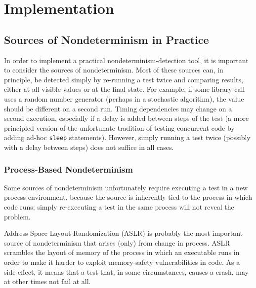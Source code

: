 \section{Implementation}

\subsection{Sources of Nondeterminism in Practice}

In order to implement a practical nondeterminism-detection tool, it is
important to consider the sources of nondeterminism.  Most of these
sources can, in principle, be detected simply by re-running a test
twice and comparing results, either at all visible values or at the
final state.  For example, if some library call uses a random number
generator (perhaps in a stochastic algorithm), the value should be
different on a second run.  Timing dependencies may change on a second
execution, especially if a delay is added between steps of the test (a
more principled version of the unfortunate tradition of testing
concurrent code by adding ad-hoc {\tt sleep} statements).  However,
simply running a test twice (possibly with a delay between steps) does
not suffice in all cases.

\subsubsection{Process-Based Nondeterminism}

\label{sec:pnondet}

Some sources of nondeterminism unfortunately require executing a test in a new
process environment, because the source is inherently tied to the
process in which code runs; simply re-executing a test in the same
process will not reveal the problem.

Address Space Layout Randomization (ASLR) \cite{ASLR}  is probably the most
important source of nondeterminism that arises (only) from change in
process.  ASLR scrambles the layout of memory of the process in which
an executable runs in order to make it harder to exploit memory-safety
vulnerabilities in code.  As a side effect, it
means that a test that, in some circumstances, causes a crash, may at
other times not fail at all.

